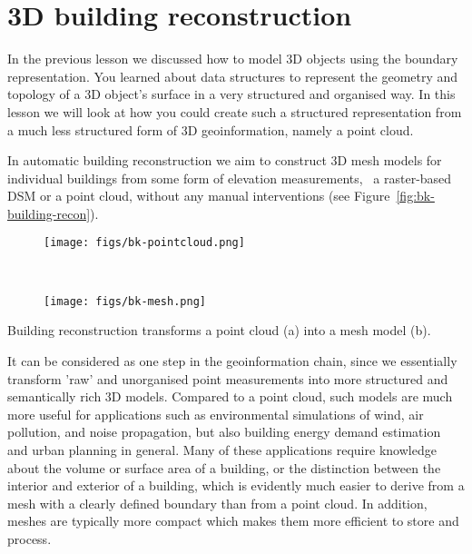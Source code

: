 
\setchapterpreamble[u]{\margintoc}

\graphicspath{{LoD2recon/}}

\chapter{3D building reconstruction}%
\label{chap:LoD2recon}

In the previous lesson we discussed how to model 3D objects using the boundary representation.
You learned about data structures to represent the geometry and topology of a 3D object's surface in a very structured and organised way.
In this lesson we will look at how you could create such a structured representation from a much less structured form of 3D geoinformation, namely a point cloud.

In automatic building reconstruction we aim to construct 3D mesh models for individual buildings from some form of elevation measurements, \ie\ a raster-based DSM or a point cloud, without any manual interventions (see Figure~\ref{fig:bk-building-recon}).
\begin{marginfigure}
	\centering
	\begin{subfigure}{\linewidth}
		\texttt{[image: figs/bk-pointcloud.png]}
		\caption{}%
		\label{subfig:bk-pc}
	\end{subfigure}
\\
	\begin{subfigure}{\linewidth}
		\texttt{[image: figs/bk-mesh.png]}
		\caption{}%
		\label{subfig:bk-mesh}
	\end{subfigure}
	\caption{Building reconstruction transforms a point cloud (a) into a mesh model (b).}%
	\label{fig:bk-building-recon}
\end{marginfigure}
It can be considered as one step in the geoinformation chain, since we essentially transform 'raw' and unorganised point measurements into more structured and semantically rich 3D models.
Compared to a point cloud, such models are much more useful for applications such as environmental simulations of wind, air pollution, and noise propagation, but also building energy demand estimation and urban planning in general.
Many of these applications require knowledge about the volume or surface area of a building, or the distinction between the interior and exterior of a building, which is evidently much easier to derive from a mesh with a clearly defined boundary than from a point cloud.
In addition, meshes are typically more compact which makes them more efficient to store and process.

